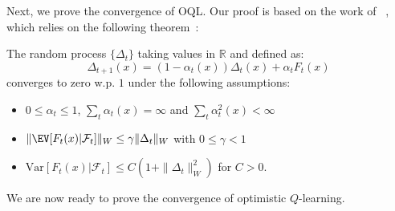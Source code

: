 Next, we prove the convergence of OQL. Our proof is based on the work of \citeauthor{melo2001convergence}~, which relies on the following theorem~\cite{jaakkola1994convergence}:
\begin{theorem}
	The random process $\{\Delta_t\}$ taking values in $\mathbb{R}$ and defined as:
	\begin{equation}
	\Delta_{t+1}(x) = (1- \alpha_t(x)) \Delta_t(x) + \alpha_t F_t(x)
	\end{equation}
	converges to zero w.p. $1$ under the following assumptions:
	\begin{itemize}
		\item $0 \leq \alpha_t \leq 1$, $\sum_t \alpha_t(x)  = \infty$ and $\sum_t \alpha^2_t(x) < \infty$
		\item $\|\EV[F_t(x)| \mathcal{F}_t]\|_W \leq \gamma \|\Delta_t\|_W$ with $0\leq \gamma < 1$
		\item $\mathrm{Var}[F_t(x)| \mathcal{F}_t] \leq C(1+\|\Delta_t\|^2_W)$ for $C>0$.
	\end{itemize}
	\label{theo:randomprocess}
\end{theorem}
We are now ready to prove the convergence of optimistic $Q$-learning.
